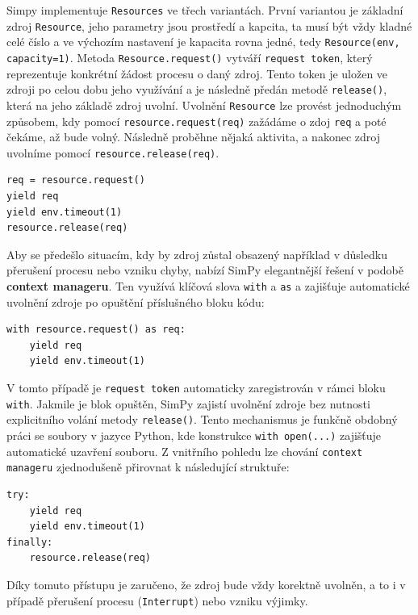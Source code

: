 \documentclass[12pt,a4paper]{article}
\begin{document}
Simpy implementuje \texttt{Resources} ve třech variantách. První variantou je základní zdroj \texttt{Resource}, jeho parametry jsou prostředí a kapcita, ta musí být vždy kladné celé číslo a ve výchozím nastavení je kapacita rovna jedné, tedy \texttt{Resource(env, capacity=1)}. Metoda \texttt{Resource.request()} vytváří \texttt{request token}, který reprezentuje konkrétní žádost procesu o daný zdroj. Tento token je uložen ve zdroji po celou dobu jeho využívání a je následně předán metodě \texttt{release()}, která na jeho základě zdroj uvolní.  Uvolnění \texttt{Resource} lze provést jednoduchým způsobem, kdy pomocí \texttt{resource.request(req)} zažádáme o zdoj \texttt{req} a poté čekáme, až bude volný. Následně proběhne nějaká aktivita, a nakonec zdroj uvolníme pomocí \texttt{resource.release(req)}.

\begin{verbatim}
req = resource.request()  
yield req              
yield env.timeout(1)
resource.release(req)      
\end{verbatim}

Aby se předešlo situacím, kdy by zdroj zůstal obsazený například v důsledku přerušení procesu nebo vzniku chyby, nabízí SimPy elegantnější řešení v podobě \textbf{context manageru}. Ten využívá klíčová slova \texttt{with} a \texttt{as} a zajišťuje automatické uvolnění zdroje po opuštění příslušného bloku kódu:

\begin{verbatim}
with resource.request() as req:
    yield req              
    yield env.timeout(1)
\end{verbatim}

V tomto případě je \texttt{request token} automaticky zaregistrován v rámci bloku \texttt{with}. Jakmile je blok opuštěn, SimPy zajistí uvolnění zdroje bez nutnosti explicitního volání metody \texttt{release()}. Tento mechanismus je funkčně obdobný práci se soubory v jazyce Python, kde konstrukce \texttt{with open(...)} zajišťuje automatické uzavření souboru. Z vnitřního pohledu lze chování \texttt{context manageru} zjednodušeně přirovnat k následující struktuře:

\begin{verbatim}
try:
    yield req
    yield env.timeout(1)
finally:
    resource.release(req)
\end{verbatim}

Díky tomuto přístupu je zaručeno, že zdroj bude vždy korektně uvolněn, a to i v případě přerušení procesu (\texttt{Interrupt}) nebo vzniku výjimky. 
\end{document}
